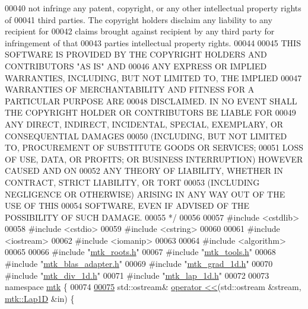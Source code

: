 \begin{DoxyCode}
00040 \textcolor{comment}{not infringe any patent, copyright, or any other intellectual property rights of}
00041 \textcolor{comment}{third parties. The copyright holders disclaim any liability to any recipient for}
00042 \textcolor{comment}{claims brought against recipient by any third party for infringement of that}
00043 \textcolor{comment}{parties intellectual property rights.}
00044 \textcolor{comment}{}
00045 \textcolor{comment}{THIS SOFTWARE IS PROVIDED BY THE COPYRIGHT HOLDERS AND CONTRIBUTORS "AS IS" AND}
00046 \textcolor{comment}{ANY EXPRESS OR IMPLIED WARRANTIES, INCLUDING, BUT NOT LIMITED TO, THE IMPLIED}
00047 \textcolor{comment}{WARRANTIES OF MERCHANTABILITY AND FITNESS FOR A PARTICULAR PURPOSE ARE}
00048 \textcolor{comment}{DISCLAIMED. IN NO EVENT SHALL THE COPYRIGHT HOLDER OR CONTRIBUTORS BE LIABLE FOR}
00049 \textcolor{comment}{ANY DIRECT, INDIRECT, INCIDENTAL, SPECIAL, EXEMPLARY, OR CONSEQUENTIAL DAMAGES}
00050 \textcolor{comment}{(INCLUDING, BUT NOT LIMITED TO, PROCUREMENT OF SUBSTITUTE GOODS OR SERVICES;}
00051 \textcolor{comment}{LOSS OF USE, DATA, OR PROFITS; OR BUSINESS INTERRUPTION) HOWEVER CAUSED AND ON}
00052 \textcolor{comment}{ANY THEORY OF LIABILITY, WHETHER IN CONTRACT, STRICT LIABILITY, OR TORT}
00053 \textcolor{comment}{(INCLUDING NEGLIGENCE OR OTHERWISE) ARISING IN ANY WAY OUT OF THE USE OF THIS}
00054 \textcolor{comment}{SOFTWARE, EVEN IF ADVISED OF THE POSSIBILITY OF SUCH DAMAGE.}
00055 \textcolor{comment}{*/}
00056 
00057 \textcolor{preprocessor}{#include <cstdlib>}
00058 \textcolor{preprocessor}{#include <cstdio>}
00059 \textcolor{preprocessor}{#include <cstring>}
00060 
00061 \textcolor{preprocessor}{#include <iostream>}
00062 \textcolor{preprocessor}{#include <iomanip>}
00063 
00064 \textcolor{preprocessor}{#include <algorithm>}
00065 
00066 \textcolor{preprocessor}{#include "\hyperlink{mtk__roots_8h}{mtk\_roots.h}"}
00067 \textcolor{preprocessor}{#include "\hyperlink{mtk__tools_8h}{mtk\_tools.h}"}
00068 \textcolor{preprocessor}{#include "\hyperlink{mtk__blas__adapter_8h}{mtk\_blas\_adapter.h}"}
00069 \textcolor{preprocessor}{#include "\hyperlink{mtk__grad__1d_8h}{mtk\_grad\_1d.h}"}
00070 \textcolor{preprocessor}{#include "\hyperlink{mtk__div__1d_8h}{mtk\_div\_1d.h}"}
00071 \textcolor{preprocessor}{#include "\hyperlink{mtk__lap__1d_8h}{mtk\_lap\_1d.h}"}
00072 
00073 \textcolor{keyword}{namespace }\hyperlink{namespacemtk}{mtk} \{
00074 
\hypertarget{mtk__lap__1d_8cc_source_l00075}{}\hyperlink{namespacemtk_af667c01a388ef1815d549b09b2d76bcc}{00075} std::ostream& \hyperlink{namespacemtk_ad3bcf52cda59ddb5fc7b4bdce76c46dc}{operator <<}(std::ostream &stream, \hyperlink{classmtk_1_1Lap1D}{mtk::Lap1D} &in) \{

\end{DoxyCode}
